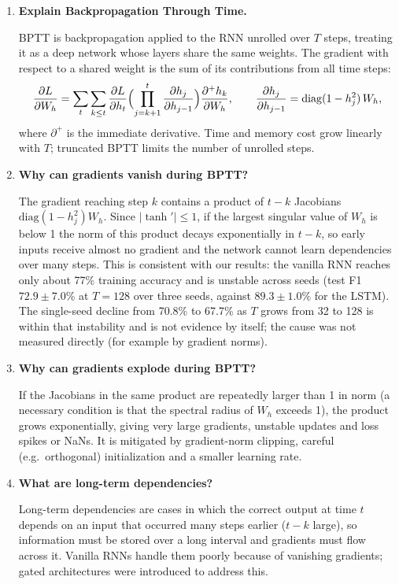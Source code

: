 \documentclass[10pt]{article}
\begin{document}
\begin{enumerate}[itemsep=6pt,topsep=3pt]
\item \textbf{Explain Backpropagation Through Time.}\par\smallskip
BPTT is backpropagation applied to the RNN unrolled over $T$ steps, treating it as a deep network whose layers share the same weights. The gradient with respect to a shared weight is the sum of its contributions from all time steps:
\[
\frac{\partial L}{\partial W_h}=\sum_{t}\sum_{k\le t}\frac{\partial L}{\partial h_t}\Bigl(\prod_{j=k+1}^{t}\frac{\partial h_j}{\partial h_{j-1}}\Bigr)\frac{\partial^{+}h_k}{\partial W_h},
\qquad
\frac{\partial h_j}{\partial h_{j-1}}=\mathrm{diag}(1-h_j^{2})\,W_h,
\]
where $\partial^{+}$ is the immediate derivative. Time and memory cost grow linearly with $T$; truncated BPTT limits the number of unrolled steps.

\item \textbf{Why can gradients vanish during BPTT?}\par\smallskip
The gradient reaching step $k$ contains a product of $t-k$ Jacobians $\mathrm{diag}(1-h_j^2)W_h$. Since $|\tanh'|\le1$, if the largest singular value of $W_h$ is below 1 the norm of this product decays exponentially in $t-k$, so early inputs receive almost no gradient and the network cannot learn dependencies over many steps. This is consistent with our results: the vanilla RNN reaches only about 77\% training accuracy and is unstable across seeds (test F1 $72.9\pm7.0$\% at $T{=}128$ over three seeds, against $89.3\pm1.0$\% for the LSTM). The single-seed decline from 70.8\% to 67.7\% as $T$ grows from 32 to 128 is within that instability and is not evidence by itself; the cause was not measured directly (for example by gradient norms).

\item \textbf{Why can gradients explode during BPTT?}\par\smallskip
If the Jacobians in the same product are repeatedly larger than 1 in norm (a necessary condition is that the spectral radius of $W_h$ exceeds 1), the product grows exponentially, giving very large gradients, unstable updates and loss spikes or NaNs. It is mitigated by gradient-norm clipping, careful (e.g.\ orthogonal) initialization and a smaller learning rate.

\item \textbf{What are long-term dependencies?}\par\smallskip
Long-term dependencies are cases in which the correct output at time $t$ depends on an input that occurred many steps earlier ($t-k$ large), so information must be stored over a long interval and gradients must flow across it. Vanilla RNNs handle them poorly because of vanishing gradients; gated architectures were introduced to address this.


\end{enumerate}
\end{document}

